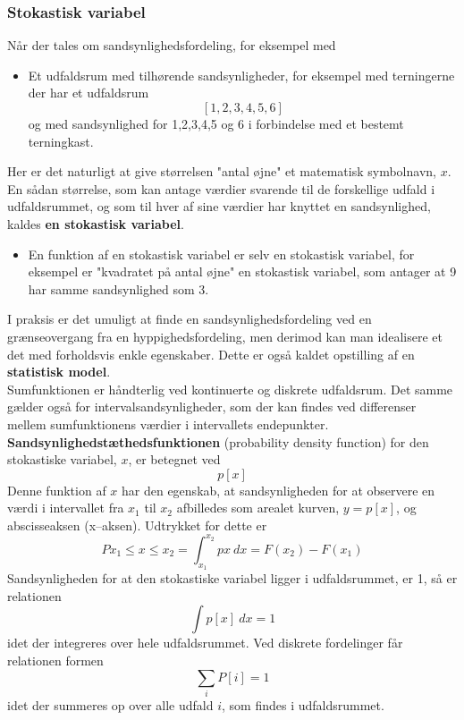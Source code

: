 \documentclass[11pt]{article}
\begin{document}
\subsubsection{Stokastisk variabel}
Når der tales om sandsynlighedsfordeling, for eksempel med
\begin{itemize}\itemsep-2pt
\item Et udfaldsrum med tilhørende sandsynligheder, for eksempel med terningerne der har et udfaldsrum 
$$[1,2,3,4,5,6]$$
og med sandsynlighed for 1,2,3,4,5 og 6 i forbindelse med et bestemt terningkast. 
\end{itemize}
Her er det naturligt at give størrelsen "antal øjne" et matematisk symbolnavn, $x$. En sådan størrelse, som kan antage værdier svarende til de forskellige udfald i udfaldsrummet, og som til hver af sine værdier har knyttet en sandsynlighed, kaldes \textbf{en stokastisk variabel}.
\begin{itemize}\itemsep-2pt
\item En funktion af en stokastisk variabel er selv en stokastisk variabel, for eksempel er "kvadratet på antal øjne" en stokastisk variabel, som antager at 9 har samme sandsynlighed som 3. 
\end{itemize}
I praksis er det umuligt at finde en sandsynlighedsfordeling ved en grænseovergang fra en hyppighedsfordeling, men derimod kan man idealisere et det med forholdsvis enkle egenskaber. Dette er også kaldet opstilling af en \textbf{statistisk model}.\\[0.2cm]
Sumfunktionen er håndterlig ved kontinuerte og diskrete udfaldsrum. Det samme gælder også for intervalsandsynligheder, som der kan findes ved differenser mellem sumfunktionens værdier i intervallets endepunkter.\\[0.2cm]
\textbf{Sandsynlighedstæthedsfunktionen} (probability density function) for den stokastiske variabel, $x$, er betegnet ved
$$p[x]$$
Denne funktion af $x$ har den egenskab, at sandsynligheden for at observere en værdi i intervallet fra $x_1$ til $x_2$ afbilledes som arealet kurven, $y=p[x]$, og abscisseaksen (x--aksen). Udtrykket for dette er
$$P{x_1\leq x\leq x_2}=\int_{x_1}^{x_2}p{x}\:dx=F(x_2)-F(x_1)$$
Sandsynligheden for at den stokastiske variabel ligger i udfaldsrummet, er 1, så er relationen
$$\int p[x]\:dx=1$$
idet der integreres over hele udfaldsrummet. Ved diskrete fordelinger får relationen formen
$$\sum_i P[i]=1$$
idet der summeres op over alle udfald $i$, som findes i udfaldsrummet. 
\end{document}
